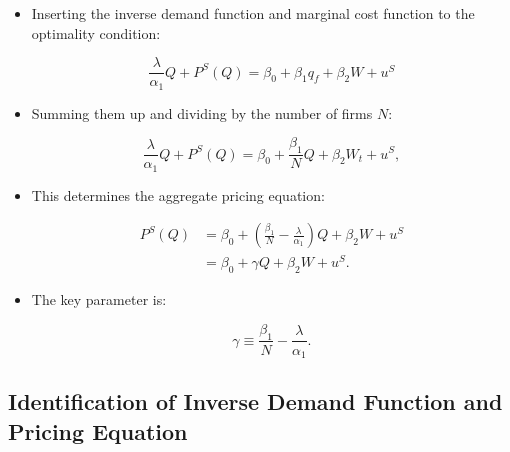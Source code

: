 \documentclass[]{book}
\providecommand{\tightlist}{%
  \setlength{\itemsep}{0pt}\setlength{\parskip}{0pt}}
\begin{document}
\begin{itemize}
\tightlist
\item
  Inserting the inverse demand function and marginal cost function to
  the optimality condition:

  \begin{equation}
  \frac{\lambda}{\alpha_1} Q + P^S(Q) = \beta_0 + \beta_1 q_f + \beta_2 W + u^S
  \end{equation}
\item
  Summing them up and dividing by the number of firms \(N\):

  \begin{equation}
  \frac{\lambda}{\alpha_1} Q + P^S(Q) = \beta_0 + \frac{\beta_1}{N} Q + \beta_2 W_t + u^S,
  \end{equation}
\item
  This determines the aggregate pricing equation:

  \begin{equation}
  \begin{split}
  P^S(Q) &= \beta_0 + (\frac{\beta_1}{N} - \frac{\lambda}{\alpha_1})Q + \beta_2 W + u^S\\
  &= \beta_0 + \gamma Q + \beta_2 W + u^S.
  \end{split}
  \end{equation}
\item
  The key parameter is:

  \begin{equation}
  \gamma \equiv \frac{\beta_1}{N} - \frac{\lambda}{\alpha_1}.
  \end{equation}
\end{itemize}

\subsection{Identification of Inverse Demand Function and Pricing
Equation}\label{identification-of-inverse-demand-function-and-pricing-equation}
\end{document}
